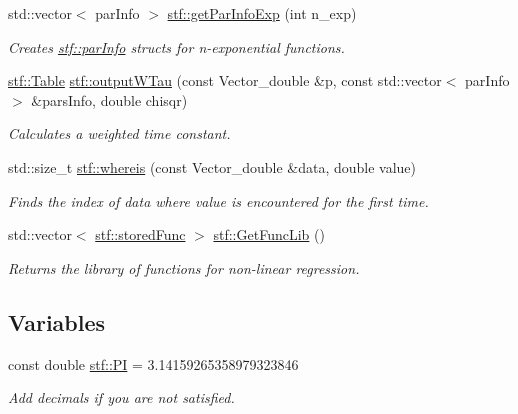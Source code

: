 \begin{DoxyCompactItemize}
std::vector$<$ parInfo $>$ \hyperlink{group__stfgen_gaa535878b74675e92a48e0e20a7e6b1a6}{stf::getParInfoExp} (int n\_\-exp)
\begin{DoxyCompactList}\small\item\em Creates \hyperlink{structstf_1_1parInfo}{stf::parInfo} structs for n-\/exponential functions. \item\end{DoxyCompactList}\item 
\hyperlink{classstf_1_1Table}{stf::Table} \hyperlink{group__stfgen_ga62fd233e1b8aaa7e71bcc639793b3c93}{stf::outputWTau} (const Vector\_\-double \&p, const std::vector$<$ parInfo $>$ \&parsInfo, double chisqr)
\begin{DoxyCompactList}\small\item\em Calculates a weighted time constant. \item\end{DoxyCompactList}\item 
std::size\_\-t \hyperlink{group__stfgen_ga7fa85af19cf73937c166e0fa1aad7955}{stf::whereis} (const Vector\_\-double \&data, double value)
\begin{DoxyCompactList}\small\item\em Finds the index of {\itshape data\/} where {\itshape value\/} is encountered for the first time. \item\end{DoxyCompactList}\item 
std::vector$<$ \hyperlink{structstf_1_1storedFunc}{stf::storedFunc} $>$ \hyperlink{group__stfgen_ga14b43f4510558137aac70408cd1c036b}{stf::GetFuncLib} ()
\begin{DoxyCompactList}\small\item\em Returns the library of functions for non-\/linear regression. \item\end{DoxyCompactList}\end{DoxyCompactItemize}
\subsection*{Variables}
\begin{DoxyCompactItemize}
\item 
\hypertarget{group__stfgen_ga5b9c4776a431231a9db345759e7de8ae}{
const double \hyperlink{group__stfgen_ga5b9c4776a431231a9db345759e7de8ae}{stf::PI} = 3.14159265358979323846}
\label{group__stfgen_ga5b9c4776a431231a9db345759e7de8ae}

\begin{DoxyCompactList}\small\item\em Add decimals if you are not satisfied. \item\end{DoxyCompactList}\end{DoxyCompactItemize}


